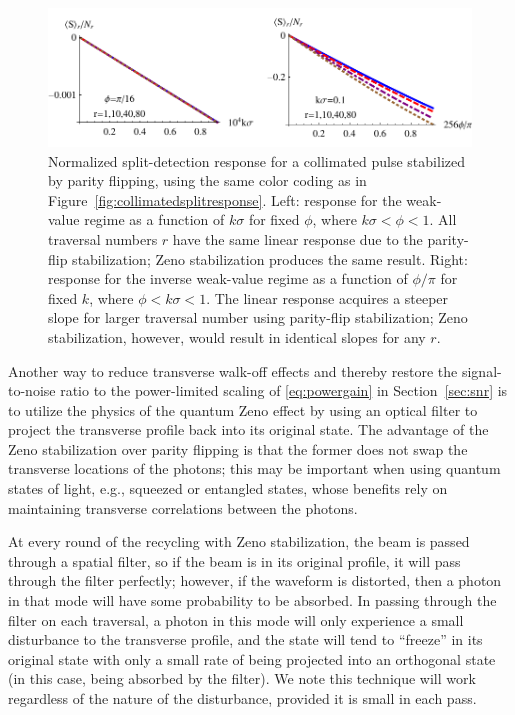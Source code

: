 \begin{figure}[t]
  \begin{center}
    \includegraphics[width=6in]{PulsedRecycling/Figures/responseplot-flip.pdf}
  \end{center}
  \caption{Normalized split-detection response for a collimated pulse stabilized by parity flipping, using the same color coding as in Figure~\ref{fig:collimatedsplitresponse}.  Left: response for the weak-value regime as a function of $k\sigma$ for fixed $\phi$, where $k\sigma < \phi < 1$.  All traversal numbers $r$ have the same linear response due to the parity-flip stabilization; Zeno stabilization produces the same result.  Right: response for the inverse weak-value regime as a function of $\phi / \pi$ for fixed $k$, where $\phi < k\sigma < 1$.  The linear response acquires a steeper slope for larger traversal number using parity-flip stabilization; Zeno stabilization, however, would result in identical slopes for any $r$. }
  \label{fig:collimatedsplitresponseflip}
\end{figure}
Another way to reduce transverse walk-off effects and thereby restore the signal-to-noise ratio to the power-limited scaling of \eqref{eq:powergain} in Section~\ref{sec:snr} is to utilize the physics of the quantum Zeno effect by using an optical filter to project the transverse profile back into its original state.  The advantage of the Zeno stabilization over parity flipping is that the former does not swap the transverse locations of the photons; this may be important when using quantum states of light, e.g., squeezed or entangled states, whose benefits rely on maintaining transverse correlations between the photons.

At every round of the recycling with Zeno stabilization, the beam is passed through a spatial filter, so if the beam is in its original profile, it will pass through the filter perfectly; however, if the waveform is distorted, then a photon in that mode will have some probability to be absorbed.  In passing through the filter on each traversal, a photon in this mode will only experience a small disturbance to the transverse profile, and the state will tend to ``freeze'' in its original state with only a small rate of being projected into an orthogonal state (in this case, being absorbed by the filter).  We note this technique will work regardless of the nature of the disturbance, provided it is small in each pass.  

